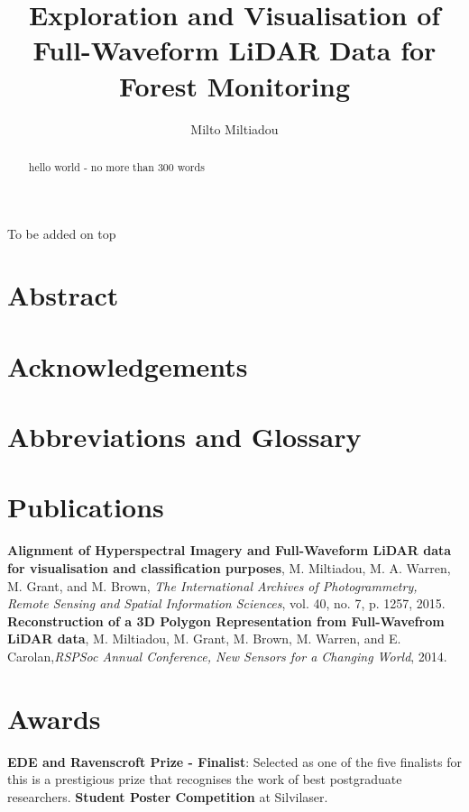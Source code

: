 \documentclass[11pt,nofootinbib]{report}
\title{Exploration and Visualisation of Full-Waveform LiDAR Data for Forest Monitoring}
\author{Milto Miltiadou}
\begin{document}
	\maketitle
 		
\begin{abstract}	
     hello world - no more than 300 words
     \thispagestyle{empty}
\end{abstract}

\newpage
\thispagestyle{empty}
	\setcounter{secnumdepth}{0}

	To be added on top
	\section{Abstract}\label{Abstract}
		
		\thispagestyle{empty}
		\newpage
	\section{Acknowledgements}\label{Acknowledgments}
		
		\thispagestyle{empty}
		\newpage
	

	\section {Abbreviations and Glossary}\label{Abbreviations}
	
	\newpage
	\section{Publications}
		\textbf{Alignment of Hyperspectral Imagery and Full-Waveform LiDAR data for visualisation and classification purposes}, M. Miltiadou, M. A. Warren, M. Grant, and M. Brown, \textit{The International Archives of Photogrammetry, Remote Sensing and Spatial Information Sciences}, vol. 40, no. 7, p. 1257, 2015.\newline
		\textbf{Reconstruction of a 3D Polygon Representation from Full-Wavefrom LiDAR data}, M. Miltiadou, M. Grant, M. Brown, M. Warren, and E. Carolan,\textit{RSPSoc Annual Conference, New Sensors for a Changing World}, 2014.\newline
	 
	
	\section{Awards}
		\textbf{EDE and Ravenscroft Prize - Finalist}: Selected as one of the five finalists for this is a prestigious prize that recognises the work of best postgraduate researchers.\newline
		\textbf{Student Poster Competition} at Silvilaser.
		
\end{document}
